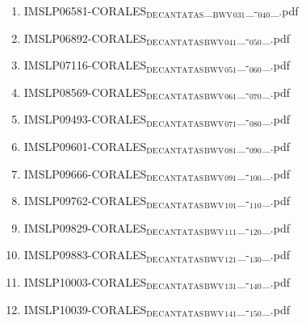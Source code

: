 \documentclass[11pt]{article}
\begin{document}
\begin{enumerate}
\begin{enumerate}
\begin{enumerate}
\begin{enumerate}
\item IMSLP06581-CORALES$_{\text{DE}}$$_{\text{CANTATAS}}$\_$_{\text{BWV}}$$_{\text{031}}$\_-$_{\text{040}}$\_.pdf
\label{sec-1-1-1-1-44-6-7-2-5-5}

\item IMSLP06892-CORALES$_{\text{DE}}$$_{\text{CANTATAS}}$$_{\text{BWV}}$$_{\text{041}}$\_-$_{\text{050}}$\_.pdf
\label{sec-1-1-1-1-44-6-7-2-5-6}

\item IMSLP07116-CORALES$_{\text{DE}}$$_{\text{CANTATAS}}$$_{\text{BWV}}$$_{\text{051}}$\_-$_{\text{060}}$\_.pdf
\label{sec-1-1-1-1-44-6-7-2-5-7}

\item IMSLP08569-CORALES$_{\text{DE}}$$_{\text{CANTATAS}}$$_{\text{BWV}}$$_{\text{061}}$\_-$_{\text{070}}$\_.pdf
\label{sec-1-1-1-1-44-6-7-2-5-8}

\item IMSLP09493-CORALES$_{\text{DE}}$$_{\text{CANTATAS}}$$_{\text{BWV}}$$_{\text{071}}$\_-$_{\text{080}}$\_.pdf
\label{sec-1-1-1-1-44-6-7-2-5-9}

\item IMSLP09601-CORALES$_{\text{DE}}$$_{\text{CANTATAS}}$$_{\text{BWV}}$$_{\text{081}}$\_-$_{\text{090}}$\_.pdf
\label{sec-1-1-1-1-44-6-7-2-5-10}

\item IMSLP09666-CORALES$_{\text{DE}}$$_{\text{CANTATAS}}$$_{\text{BWV}}$$_{\text{091}}$\_-$_{\text{100}}$\_.pdf
\label{sec-1-1-1-1-44-6-7-2-5-11}

\item IMSLP09762-CORALES$_{\text{DE}}$$_{\text{CANTATAS}}$$_{\text{BWV}}$$_{\text{101}}$\_-$_{\text{110}}$\_.pdf
\label{sec-1-1-1-1-44-6-7-2-5-12}

\item IMSLP09829-CORALES$_{\text{DE}}$$_{\text{CANTATAS}}$$_{\text{BWV}}$$_{\text{111}}$\_-$_{\text{120}}$\_.pdf
\label{sec-1-1-1-1-44-6-7-2-5-13}

\item IMSLP09883-CORALES$_{\text{DE}}$$_{\text{CANTATAS}}$$_{\text{BWV}}$$_{\text{121}}$\_-$_{\text{130}}$\_.pdf
\label{sec-1-1-1-1-44-6-7-2-5-14}

\item IMSLP10003-CORALES$_{\text{DE}}$$_{\text{CANTATAS}}$$_{\text{BWV}}$$_{\text{131}}$\_-$_{\text{140}}$\_.pdf
\label{sec-1-1-1-1-44-6-7-2-5-15}

\item IMSLP10039-CORALES$_{\text{DE}}$$_{\text{CANTATAS}}$$_{\text{BWV}}$$_{\text{141}}$\_-$_{\text{150}}$\_.pdf
\label{sec-1-1-1-1-44-6-7-2-5-16}


\end{enumerate}
\end{enumerate}
\end{enumerate}
\end{enumerate}
\end{document}
